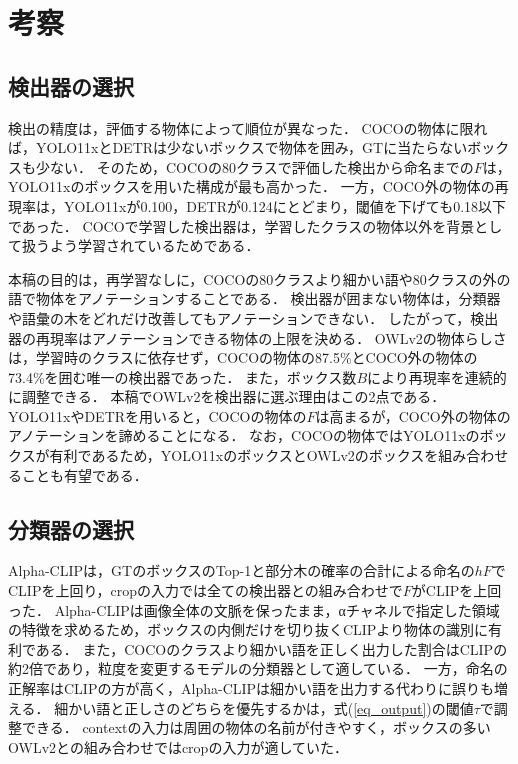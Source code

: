\section{考察}
\subsection{検出器の選択}
検出の精度は，評価する物体によって順位が異なった．
COCOの物体に限れば，YOLO11xとDETRは少ないボックスで物体を囲み，GTに当たらないボックスも少ない．
そのため，COCOの80クラスで評価した検出から命名までの$ F $は，YOLO11xのボックスを用いた構成が最も高かった．
一方，COCO外の物体の再現率は，YOLO11xが0.100，DETRが0.124にとどまり，閾値を下げても0.18以下であった．
COCOで学習した検出器は，学習したクラスの物体以外を背景として扱うよう学習されているためである．

本稿の目的は，再学習なしに，COCOの80クラスより細かい語や80クラスの外の語で物体をアノテーションすることである．
検出器が囲まない物体は，分類器や語彙の木をどれだけ改善してもアノテーションできない．
したがって，検出器の再現率はアノテーションできる物体の上限を決める．
OWLv2の物体らしさは，学習時のクラスに依存せず，COCOの物体の87.5\%とCOCO外の物体の73.4\%を囲む唯一の検出器であった．
また，ボックス数$ B $により再現率を連続的に調整できる．
本稿でOWLv2を検出器に選ぶ理由はこの2点である．
YOLO11xやDETRを用いると，COCOの物体の$ F $は高まるが，COCO外の物体のアノテーションを諦めることになる．
なお，COCOの物体ではYOLO11xのボックスが有利であるため，YOLO11xのボックスとOWLv2のボックスを組み合わせることも有望である．

\subsection{分類器の選択}
Alpha-CLIPは，GTのボックスのTop-1と部分木の確率の合計による命名の$ hF $でCLIPを上回り，cropの入力では全ての検出器との組み合わせで$ F $がCLIPを上回った．
Alpha-CLIPは画像全体の文脈を保ったまま，αチャネルで指定した領域の特徴を求めるため，ボックスの内側だけを切り抜くCLIPより物体の識別に有利である．
また，COCOのクラスより細かい語を正しく出力した割合はCLIPの約2倍であり，粒度を変更するモデルの分類器として適している．
一方，命名の正解率はCLIPの方が高く，Alpha-CLIPは細かい語を出力する代わりに誤りも増える．
細かい語と正しさのどちらを優先するかは，式(\ref{eq_output})の閾値$ \tau $で調整できる．
contextの入力は周囲の物体の名前が付きやすく，ボックスの多いOWLv2との組み合わせではcropの入力が適していた．


